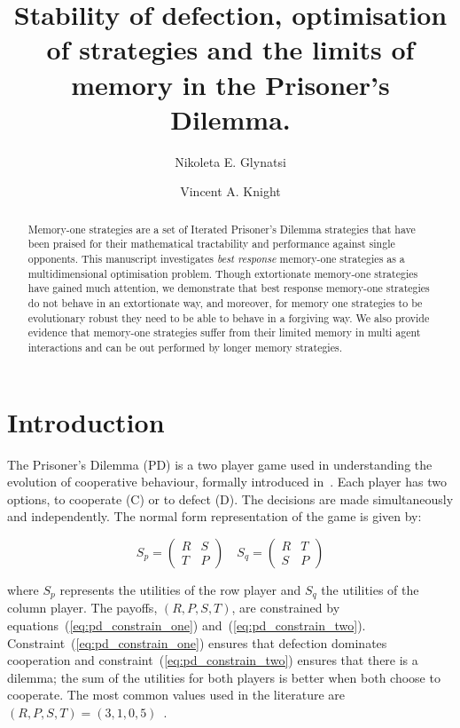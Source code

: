 \documentclass[10pt]{article}
\title{Stability of defection, optimisation of strategies and the limits of
       memory in the Prisoner's Dilemma.}
\author{Nikoleta E. Glynatsi \and Vincent A. Knight}
\date{}
\begin{document}
\maketitle

\begin{abstract}
    Memory-one strategies are a set of Iterated Prisoner's Dilemma strategies
    that have been praised for their mathematical tractability and performance
    against single opponents. This manuscript investigates \textit{best
    response} memory-one strategies as a multidimensional
    optimisation problem. Though extortionate memory-one strategies have gained
    much attention, we demonstrate that best response memory-one strategies do not
    behave in an extortionate way, and moreover, for memory one strategies to be
    evolutionary robust they need to be able to behave in a forgiving way. We
    also provide evidence that memory-one strategies suffer from their limited
    memory in multi agent interactions and can be out performed by
    longer memory strategies.
\end{abstract}

\section{Introduction}\label{section:introduction}

The Prisoner's Dilemma (PD) is a two player game used in understanding the
evolution of cooperative behaviour, formally introduced in~\cite{Flood1958}.
Each player has two options, to cooperate (C) or to defect (D). The decisions
are made simultaneously and independently. The normal form representation of the
game is given by:

\begin{equation}\label{equ:pd_definition}
    S_p =
    \begin{pmatrix}
        R & S  \\
        T & P
    \end{pmatrix}
    \quad
    S_q =
    \begin{pmatrix}
        R & T  \\
        S & P
    \end{pmatrix}
\end{equation}

where \(S_p\) represents the utilities of the row player and \(S_q\) the
utilities of the column player. The payoffs, \((R, P, S, T)\), are constrained
by equations~(\ref{eq:pd_constrain_one}) and~(\ref{eq:pd_constrain_two}).
Constraint~(\ref{eq:pd_constrain_one}) ensures that
defection dominates cooperation and constraint~(\ref{eq:pd_constrain_two})
ensures that there is a dilemma; the sum of the utilities for both players is
better when both choose to cooperate. The most common values used in the literature are
\((R, P, S, T) = (3, 1, 0, 5)\)~\cite{Axelrod1981}.
\end{document}
